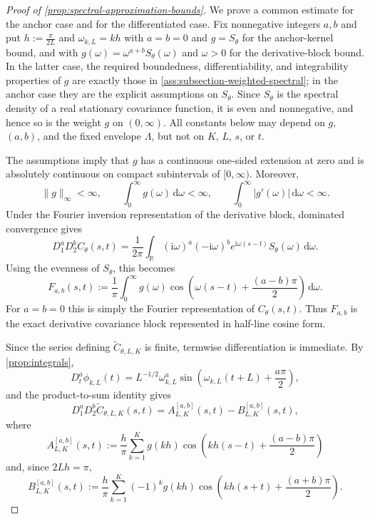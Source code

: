 \documentclass[11pt,a4paper]{article}
\theoremstyle{definition}
\theoremstyle{remark}
\begin{document}
\begin{proof}[Proof of \cref{prop:spectral-approximation-bounds}]
We prove a common estimate for the anchor case and for the differentiated case. Fix nonnegative integers $a,b$ and put $h:=\frac{\pi}{2L}$ and $\omega_{k,L}=kh$ with $a=b=0$ and $g=S_\theta$ for the anchor-kernel bound, and with $g(\omega)=\omega^{a+b}S_\theta(\omega)$ and $\omega>0$ for the derivative-block bound. In the latter case, the required boundedness, differentiability, and integrability properties of $g$ are exactly those in \cref{ass:subsection-weighted-spectral}; in the anchor case they are the explicit assumptions on $S_\theta$. Since $S_\theta$ is the spectral density of a real stationary covariance function, it is even and nonnegative, and hence so is the weight $g$ on $(0,\infty)$. All constants below may depend on \(g\), \((a,b)\), and the fixed envelope \(\Lambda\), but not on \(K\), \(L\), \(s\), or \(t\).

The assumptions imply that $g$ has a continuous one-sided extension at zero and is absolutely continuous on compact subintervals of $[0,\infty)$. Moreover,
\[
    \|g\|_\infty<\infty,\qquad
    \int_0^\infty g(\omega)\,\mathrm d\omega<\infty,
    \qquad
    \int_0^\infty |g'(\omega)|\,\mathrm d\omega<\infty .
\]
Under the Fourier inversion representation of the derivative block, dominated convergence gives
\[
D_1^aD_2^b C_\theta(s,t)
=
\frac{1}{2\pi}\int_{\mathbb R}
(\mathrm i\omega)^a(-\mathrm i\omega)^b e^{\mathrm i\omega(s-t)}S_\theta(\omega)\,\mathrm d\omega.
\]
Using the evenness of $S_\theta$, this becomes
\[
F_{a,b}(s,t)
:=
\frac{1}{\pi}\int_0^\infty
    g(\omega)
    \cos\!\left(\omega(s-t)+\frac{(a-b)\pi}{2}\right)
\,\mathrm d\omega .
\]
For $a=b=0$ this is simply the Fourier representation of $C_\theta(s,t)$. Thus \(F_{a,b}\) is the exact derivative covariance block represented in half-line cosine form.

Since the series defining $\widetilde C_{\theta,L,K}$ is finite, termwise differentiation is immediate. By \cref{prop:integrals},
\[
D_t^a\phi_{k,L}(t)
=
L^{-1/2}\omega_{k,L}^a
\sin\!\left(\omega_{k,L}(t+L)+\frac{a\pi}{2}\right),
\]
and the product-to-sum identity gives
\[
D_1^aD_2^b\widetilde C_{\theta,L,K}(s,t)
=
A_{L,K}^{[a,b]}(s,t)-B_{L,K}^{[a,b]}(s,t),
\]
where
\[
A_{L,K}^{[a,b]}(s,t)
:=
\frac{h}{\pi}\sum_{k=1}^K
    g(kh)
    \cos\!\left(kh(s-t)+\frac{(a-b)\pi}{2}\right)
\]
and, since $2Lh=\pi$,
\[
B_{L,K}^{[a,b]}(s,t)
:=
\frac{h}{\pi}\sum_{k=1}^K
    (-1)^k g(kh)
    \cos\!\left(kh(s+t)+\frac{(a+b)\pi}{2}\right).
\]


\end{proof}
\end{document}
